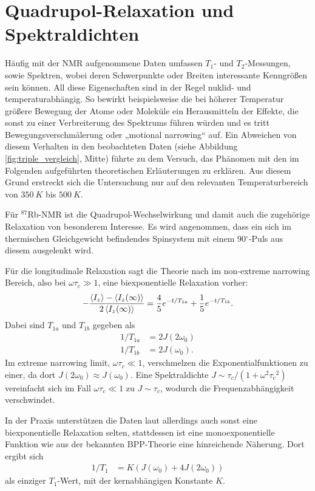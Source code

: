 \section{Quadrupol-Relaxation und Spektraldichten} \label{section:theo:eckert}

Häufig mit der NMR aufgenommene Daten umfassen $T_1$- und $T_2$-Messungen, sowie Spektren, wobei deren Schwerpunkte oder Breiten interessante Kenngrößen sein können. All diese Eigenschaften sind in der Regel nuklid- und temperaturabhängig. So bewirkt beispielsweise die bei höherer Temperatur größere Bewegung der Atome oder Moleküle ein Herausmitteln der Effekte, die sonst zu einer Verbreiterung des Spektrums führen würden und es tritt Bewegungsverschmälerung oder „motional narrowing“ auf. Ein Abweichen von diesem Verhalten in den beobachteten Daten (siehe Abbildung \ref{fig:triple_vergleich}, Mitte) führte zu dem Versuch, das Phänomen mit den im Folgenden aufgeführten theoretischen Erläuterungen zu erklären. Aus diesem Grund erstreckt sich die Untersuchung nur auf den relevanten Temperaturbereich von $\SI{350}{K}$ bis $\SI{500}{K}$.

Für $^{87}$Rb-NMR ist die Quadrupol-Wechselwirkung und damit auch die zugehörige Relaxation von besonderem Interesse. Es wird angenommen, dass ein sich im thermischen Gleichgewicht befindendes Spinsystem mit einem 90$^\circ$-Puls aus diesem ausgelenkt wird.

Für die longitudinale Relaxation sagt die Theorie nach \cite{hubbard} im non-extreme narrowing Bereich, also bei $\omega \tau_c \gg 1$, eine biexponentielle Relaxation vorher:
\begin{align}
    - \frac{\Braket{I_z} - \Braket{I_z(\infty)}}{2\Braket{I_z(\infty)}} = \frac{4}{5}e^{-t/T_{1a}} + \frac{1}{5}e^{-t/T_{1b}}.
\end{align}
Dabei sind $T_{1a}$ und $T_{1b}$ gegeben als
\begin{align}
    1/T_{1a} &= 2J(2\omega_0) \\
    1/T_{1b} &= 2J(\omega_0).
\end{align}
Im extreme narrowing limit, $\omega \tau_c \ll 1$, verschmelzen die Exponentialfunktionen zu einer, da dort $J(2\omega_0) \approx J(\omega_0)$. Eine Spektraldichte $J \sim \tau_c / (1 + \omega^2 {\tau_c}^2)$ vereinfacht sich im Fall $\omega \tau_c \ll 1$ zu $J \sim \tau_c$, wodurch die Frequenzabhängigkeit verschwindet.

In der Praxis unterstützen die Daten laut \cite{eckert} allerdings auch sonst eine biexponentielle Relaxation selten, stattdessen ist eine monoexponentielle Funktion wie aus der bekannten BPP-Theorie \cite{bpp} eine hinreichende Näherung. Dort ergibt sich
\begin{align}
    1/T_1 &= K (J(\omega_0) + 4J(2\omega_0)) \label{eqn:bpp}
\end{align}
als einziger $T_1$-Wert, mit der kernabhängigen Konstante $K$.

